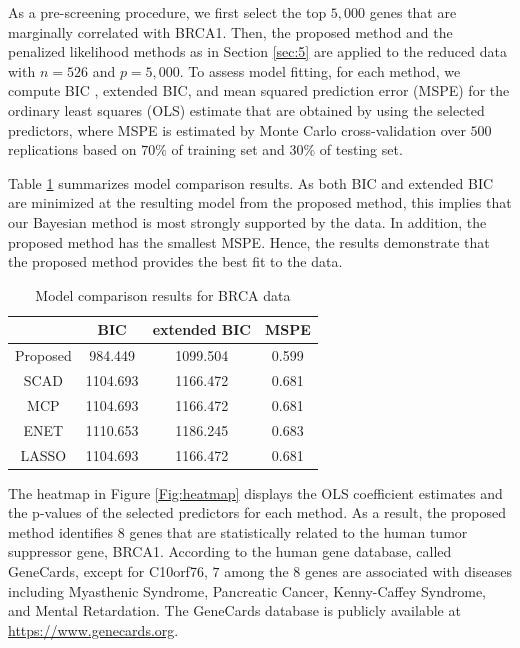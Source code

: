 As a pre-screening procedure, we first select the top $5,000$ genes that are marginally correlated with BRCA1. Then, the proposed method and the penalized likelihood methods as in Section \ref{sec:5} are applied to the reduced data with $n=526$ and $p=5,000$. To assess model fitting, for each method, we compute BIC \citep{schwarz1978}, extended BIC, and mean squared prediction error (MSPE) for the ordinary least squares (OLS) estimate that are obtained by using the selected predictors, where MSPE is estimated by Monte Carlo cross-validation over $500$ replications based on $70\%$ of training set and $30\%$ of testing set. 

Table \ref{T:realdata} summarizes model comparison results. As both BIC and extended BIC are minimized at the resulting model from the proposed method, this implies that our Bayesian method is most strongly supported by the data. In addition, the proposed method has the smallest MSPE. Hence, the results demonstrate that the proposed method provides the best fit to the data. 
\begin{table}[t]
\centering
\caption{Model comparison results for BRCA data}\label{T:realdata}
 \begin{tabular}{cccc}
\hline
            & BIC     & extended BIC &  MSPE    \\
\hline
  Proposed       & 984.449  & 1099.504 &  0.599\\
  SCAD           & 1104.693 & 1166.472& 0.681 \\
  MCP           & 1104.693 & 1166.472& 0.681  \\
  ENET           & 1110.653 & 1186.245&  0.683 \\
  LASSO         & 1104.693 & 1166.472  &  0.681\\
\hline
 \end{tabular}
\end{table}
The heatmap in Figure \ref{Fig:heatmap} displays the OLS coefficient estimates and the p-values of the selected predictors for each method. As a result, the proposed method identifies $8$ genes that are statistically related to the human tumor suppressor gene, BRCA1. According to the human gene database, called GeneCards, except for C10orf76, $7$ among the $8$ genes are associated with diseases including Myasthenic Syndrome, Pancreatic Cancer, Kenny-Caffey Syndrome, and Mental Retardation. The GeneCards database is publicly available at \url{https://www.genecards.org}.

